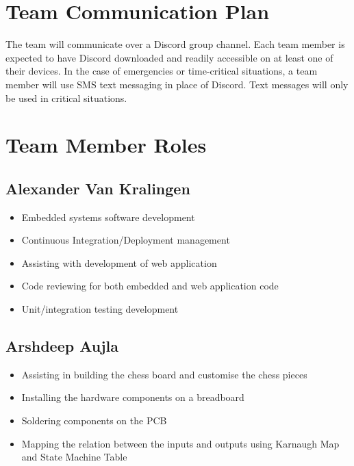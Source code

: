 \documentclass{article}
\begin{document}
\section{Team Communication Plan}
{The team will communicate over a Discord group channel. Each team member is expected to have Discord downloaded and readily accessible on at least one of their devices. 
In the case of emergencies or time-critical situations, a team member will use SMS text messaging in place of Discord. Text messages will only be used in critical situations.}

\medskip
{}

\section{Team Member Roles}
\subsection{Alexander Van Kralingen}
\begin{itemize}
    \item Embedded systems software development
    \item Continuous Integration/Deployment management
    \item Assisting with development of web application
    \item Code reviewing for both embedded and web application code
    \item Unit/integration testing development
\end{itemize}

\subsection{Arshdeep Aujla}
\begin{itemize}
    \item Assisting in building the chess board and customise the chess pieces
    \item Installing the hardware components on a breadboard
    \item Soldering components on the PCB
    \item Mapping the relation between the inputs and outputs using Karnaugh Map and State Machine Table 
\end{itemize}
\end{document}

